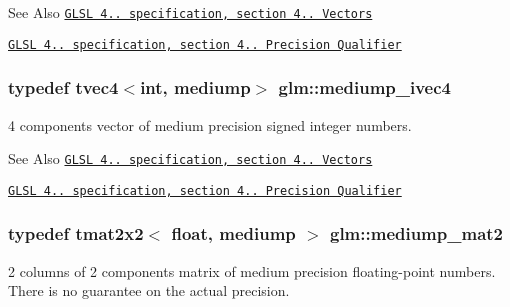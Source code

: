 \begin{DoxySeeAlso}{See Also}
\href{http://www.opengl.org/registry/doc/GLSLangSpec.4.20.8.pdf}{\tt G\-L\-S\-L 4.. specification, section 4.. Vectors} 

\href{http://www.opengl.org/registry/doc/GLSLangSpec.4.20.8.pdf}{\tt G\-L\-S\-L 4.. specification, section 4.. Precision Qualifier} 
\end{DoxySeeAlso}
\hypertarget{group__core__precision_ga687eefa63b2c9d0969227eaf23b1ad41}{
\subsubsection[{mediump\-\_\-ivec4}]{\setlength{\rightskip}{0pt plus 5cm}typedef tvec4$<$int, mediump$>$ {\bf glm\-::mediump\-\_\-ivec4}}}\label{group__core__precision_ga687eefa63b2c9d0969227eaf23b1ad41}
4 components vector of medium precision signed integer numbers.

\begin{DoxySeeAlso}{See Also}
\href{http://www.opengl.org/registry/doc/GLSLangSpec.4.20.8.pdf}{\tt G\-L\-S\-L 4.. specification, section 4.. Vectors} 

\href{http://www.opengl.org/registry/doc/GLSLangSpec.4.20.8.pdf}{\tt G\-L\-S\-L 4.. specification, section 4.. Precision Qualifier} 
\end{DoxySeeAlso}
\hypertarget{group__core__precision_ga3b83486a767447bf1b36bbf32e589bac}{
\subsubsection[{mediump\-\_\-mat2}]{\setlength{\rightskip}{0pt plus 5cm}typedef tmat2x2$<$ float, mediump $>$ {\bf glm\-::mediump\-\_\-mat2}}}\label{group__core__precision_ga3b83486a767447bf1b36bbf32e589bac}
2 columns of 2 components matrix of medium precision floating-\/point numbers. There is no guarantee on the actual precision.

